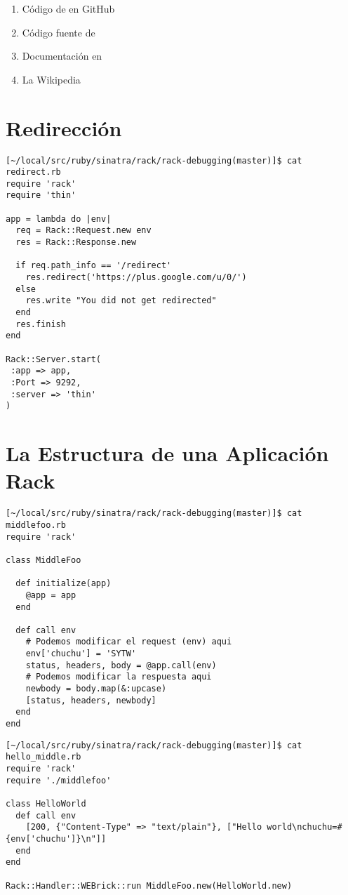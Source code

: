
\begin{enumerate}
\item 
Código de 
en GitHub
\item 
Código fuente de 
\item 
Documentación en \rackauthbasic{}
\item 
La Wikipedia 
\end{enumerate}

\section{Redirección}

\begin{verbatim}
[~/local/src/ruby/sinatra/rack/rack-debugging(master)]$ cat redirect.rb 
require 'rack'
require 'thin'

app = lambda do |env|
  req = Rack::Request.new env
  res = Rack::Response.new

  if req.path_info == '/redirect'
    res.redirect('https://plus.google.com/u/0/')
  else
    res.write "You did not get redirected"
  end
  res.finish
end

Rack::Server.start(
 :app => app,
 :Port => 9292,
 :server => 'thin'
)
\end{verbatim}

\section{La Estructura de una Aplicación Rack}
\label{section:estructuradeunaapprack}

\begin{verbatim}
[~/local/src/ruby/sinatra/rack/rack-debugging(master)]$ cat middlefoo.rb 
require 'rack'

class MiddleFoo
  
  def initialize(app)
    @app = app
  end

  def call env
    # Podemos modificar el request (env) aqui
    env['chuchu'] = 'SYTW'
    status, headers, body = @app.call(env)
    # Podemos modificar la respuesta aqui
    newbody = body.map(&:upcase)
    [status, headers, newbody]
  end
end
\end{verbatim}

\begin{verbatim}
[~/local/src/ruby/sinatra/rack/rack-debugging(master)]$ cat hello_middle.rb 
require 'rack'
require './middlefoo'

class HelloWorld
  def call env
    [200, {"Content-Type" => "text/plain"}, ["Hello world\nchuchu=#{env['chuchu']}\n"]]
  end
end

Rack::Handler::WEBrick::run MiddleFoo.new(HelloWorld.new)
\end{verbatim}

